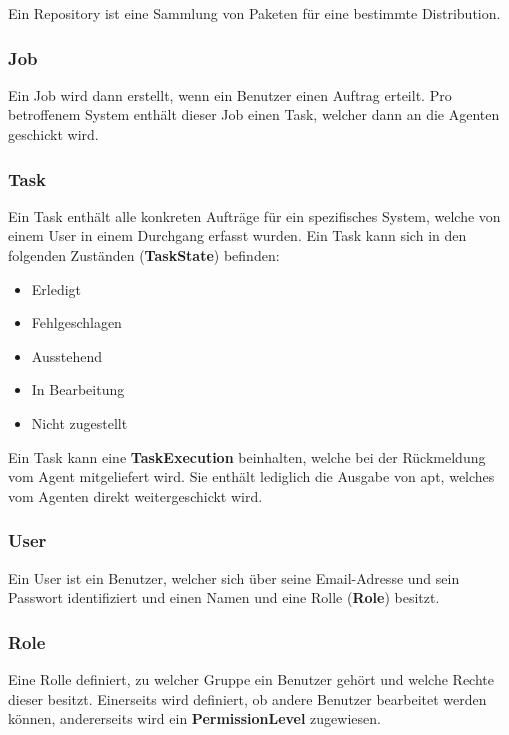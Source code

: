 Ein Repository ist eine Sammlung von Paketen für eine bestimmte Distribution.

\subsubsection{Job}

Ein Job wird dann erstellt, wenn ein Benutzer einen Auftrag erteilt. Pro betroffenem System enthält dieser Job einen Task, welcher dann an die Agenten geschickt wird.

\subsubsection{Task}

Ein Task enthält alle konkreten Aufträge für ein spezifisches System, welche von einem User in einem Durchgang erfasst wurden. Ein Task kann sich in den folgenden Zuständen (\textbf{TaskState}) befinden:

\begin{itemize}
    \item Erledigt 
    \item Fehlgeschlagen 
    \item Ausstehend
    \item In Bearbeitung
    \item Nicht zugestellt
\end{itemize}

Ein Task kann eine \textbf{TaskExecution} beinhalten, welche bei der Rückmeldung vom Agent mitgeliefert wird. Sie enthält lediglich die Ausgabe von \gls{apt}, welches vom Agenten direkt weitergeschickt wird.

\subsubsection{User}

Ein User ist ein Benutzer, welcher sich über seine Email-Adresse und sein Passwort identifiziert und einen Namen und eine Rolle (\textbf{Role}) besitzt.

\subsubsection{Role}

Eine Rolle definiert, zu welcher Gruppe ein Benutzer gehört und welche Rechte dieser besitzt. Einerseits wird definiert, ob andere Benutzer bearbeitet werden können, andererseits wird ein \textbf{PermissionLevel} zugewiesen.


